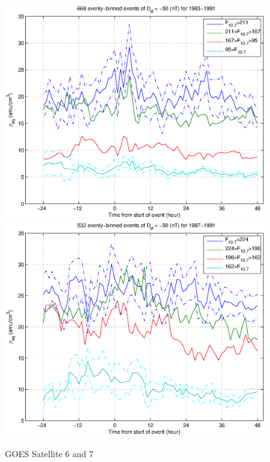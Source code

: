 \documentclass[10pt,twocolumn]{article}
\begin{document}
\begin{figure}[htp!]
\includegraphics[scale=0.45]{paperfigures/HighLowF107rhoeq-Dst50-sat6.eps}
\includegraphics[scale=0.45]{paperfigures/HighLowF107rhoeq-Dst50-sat7.eps}
\caption{GOES Satellite 6 and 7}
\end{figure}
\end{document}
